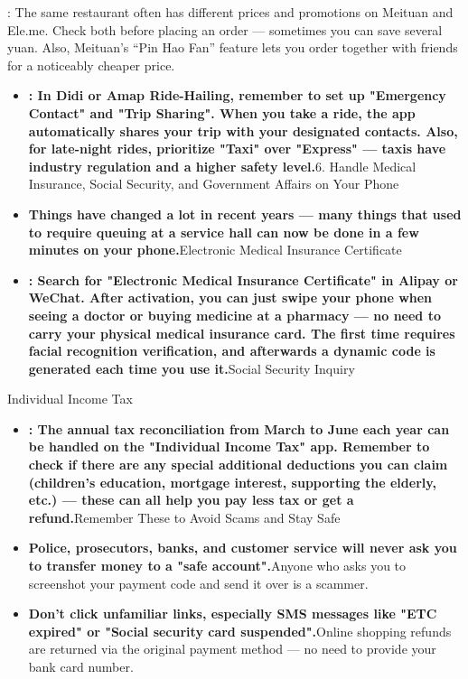 : The same restaurant often has different prices and promotions on Meituan and Ele.me. Check both before placing an order — sometimes you can save several yuan. Also, Meituan's “Pin Hao Fan” feature lets you order together with friends for a noticeably cheaper price.


\begin{itemize}
  \item \textbf{: In Didi or Amap Ride-Hailing, remember to set up "Emergency Contact" and "Trip Sharing". When you take a ride, the app automatically shares your trip with your designated contacts. Also, for late-night rides, prioritize "Taxi" over "Express" — taxis have industry regulation and a higher safety level.}6. Handle Medical Insurance, Social Security, and Government Affairs on Your Phone
  \item \textbf{Things have changed a lot in recent years — many things that used to require queuing at a service hall can now be done in a few minutes on your phone.}Electronic Medical Insurance Certificate
  \item \textbf{: Search for "Electronic Medical Insurance Certificate" in Alipay or WeChat. After activation, you can just swipe your phone when seeing a doctor or buying medicine at a pharmacy — no need to carry your physical medical insurance card. The first time requires facial recognition verification, and afterwards a dynamic code is generated each time you use it.}Social Security Inquiry
\end{itemize}


Individual Income Tax

\begin{itemize}
  \item \textbf{: The annual tax reconciliation from March to June each year can be handled on the "Individual Income Tax" app. Remember to check if there are any special additional deductions you can claim (children's education, mortgage interest, supporting the elderly, etc.) — these can all help you pay less tax or get a refund.}Remember These to Avoid Scams and Stay Safe
  \item \textbf{Police, prosecutors, banks, and customer service will never ask you to transfer money to a "safe account".}Anyone who asks you to screenshot your payment code and send it over is a scammer.
  \item \textbf{Don't click unfamiliar links, especially SMS messages like "ETC expired" or "Social security card suspended".}Online shopping refunds are returned via the original payment method — no need to provide your bank card number.
\end{itemize}

